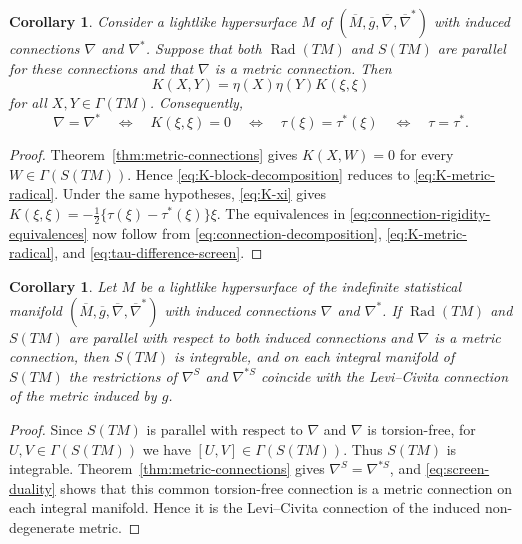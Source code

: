 \documentclass[11pt,a4paper]{article}
\newtheorem{corollary}[theorem]{Corollary}
\theoremstyle{remark}
\theoremstyle{definition}
\newcommand{\Rad}{\operatorname{Rad}}
\begin{document}
\begin{corollary}\label{cor:metric-rigidity}
Consider a lightlike hypersurface $M$ of
$(\overline{M},\overline{g},\overline{\nabla},\overline{\nabla}^{*})$
with induced connections $\nabla$ and $\nabla^{*}$. Suppose that both
$\Rad(TM)$ and $S(TM)$ are parallel for these connections and that
$\nabla$ is a metric connection. Then
\begin{equation}\label{eq:K-metric-radical}
K(X,Y)=\eta(X)\eta(Y)K(\xi,\xi)
\end{equation}
for all $X,Y\in\Gamma(TM)$. Consequently,
\begin{equation}\label{eq:connection-rigidity-equivalences}
\nabla=\nabla^{*}
\quad\Longleftrightarrow\quad
K(\xi,\xi)=0
\quad\Longleftrightarrow\quad
\tau(\xi)=\tau^{*}(\xi)
\quad\Longleftrightarrow\quad
\tau=\tau^{*}.
\end{equation}
\end{corollary}

\begin{proof}
Theorem~\ref{thm:metric-connections} gives $K(X,W)=0$ for every
$W\in\Gamma(S(TM))$. Hence \eqref{eq:K-block-decomposition} reduces to
\eqref{eq:K-metric-radical}. Under the same hypotheses,
\eqref{eq:K-xi} gives
$K(\xi,\xi)=-\frac12\{\tau(\xi)-\tau^{*}(\xi)\}\xi$.
The equivalences in \eqref{eq:connection-rigidity-equivalences} now follow
from \eqref{eq:connection-decomposition}, \eqref{eq:K-metric-radical}, and
\eqref{eq:tau-difference-screen}.
\end{proof}

\begin{corollary}\label{cor:screen-leaves}
Let $M$ be a lightlike hypersurface of the indefinite statistical manifold
$(\overline{M},\overline{g},\overline{\nabla},\overline{\nabla}^{*})$
with induced connections $\nabla$ and $\nabla^{*}$. If $\Rad(TM)$ and
$S(TM)$ are parallel with respect to both induced connections and $\nabla$
is a metric connection, then
$S(TM)$ is integrable, and on each integral manifold of $S(TM)$ the
restrictions of $\nabla^{S}$ and $\nabla^{*S}$ coincide with the
Levi--Civita connection of the metric induced by $g$.
\end{corollary}

\begin{proof}
Since $S(TM)$ is parallel with respect to $\nabla$ and $\nabla$ is
torsion-free, for $U,V\in\Gamma(S(TM))$ we have
$[U,V]\in\Gamma(S(TM))$. Thus $S(TM)$ is integrable.
Theorem~\ref{thm:metric-connections} gives
$\nabla^{S}=\nabla^{*S}$, and \eqref{eq:screen-duality} shows that this
common torsion-free connection is a metric connection on each integral
manifold. Hence it is the Levi--Civita connection of the induced
non-degenerate metric.
\end{proof}
\end{document}
